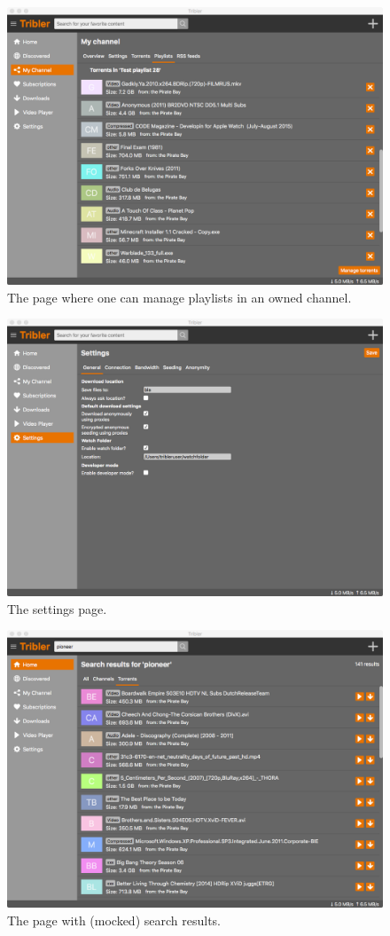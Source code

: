 \begin{figure}[h!]
	\centering
	\includegraphics[width=0.95\columnwidth]{images/qt_gui/screenshot_my_channel}
	\caption{The page where one can manage playlists in an owned channel.}
	\label{fig:gui-screenshot-my-channel}
\end{figure}

\begin{figure}[h!]
	\centering
	\includegraphics[width=0.95\columnwidth]{images/qt_gui/screenshot_settings}
	\caption{The settings page.}
	\label{fig:gui-screenshot-settings}
\end{figure}

\begin{figure}[h!]
	\centering
	\includegraphics[width=0.95\columnwidth]{images/qt_gui/screenshot_search_results}
	\caption{The page with (mocked) search results.}
	\label{fig:gui-screenshot-search-results}
\end{figure}